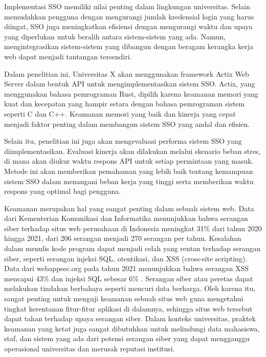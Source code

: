 \documentclass{article}
\begin{document}
Implementasi SSO memiliki nilai penting dalam lingkungan universitas. Selain memudahkan pengguna dengan mengurangi jumlah kredensial login yang harus diingat, SSO juga meningkatkan efisiensi dengan mengurangi waktu dan upaya yang diperlukan untuk beralih antara sistem-sistem yang ada. Namun, mengintegrasikan sistem-sistem yang dibangun dengan beragam kerangka kerja web dapat menjadi tantangan tersendiri.

Dalam penelitian ini, Universitas X akan menggunakan framework Actix Web Server dalam bentuk API untuk mengimplementasikan sistem SSO. Actix, yang menggunakan bahasa pemrograman Rust, dipilih karena keamanan memori yang kuat dan kecepatan yang hampir setara dengan bahasa pemrograman sistem seperti C dan C++. Keamanan memori yang baik dan kinerja yang cepat menjadi faktor penting dalam membangun sistem SSO yang andal dan efisien\autocite{kyriakou2022complementing}.

Selain itu, penelitian ini juga akan mengevaluasi performa sistem SSO yang diimplementasikan. Evaluasi kinerja akan dilakukan melalui skenario beban stres\autocite{ComparativeAnaWaluyo2022}, di mana akan diukur waktu respons API untuk setiap permintaan yang masuk. Metode ini akan memberikan pemahaman yang lebih baik tentang kemampuan sistem SSO dalam menangani beban kerja yang tinggi serta memberikan waktu respons yang optimal bagi pengguna.

Keamanan merupakan hal yang sangat penting dalam sebuah sistem web. Data dari Kementerian Komunikasi dan Informatika menunjukkan bahwa serangan siber terhadap situs web perusahaan di Indonesia meningkat 31\% dari tahun 2020 hingga 2021, dari 206 serangan menjadi 270 serangan per tahun. Kesalahan dalam menulis kode program dapat menjadi celah yang rentan terhadap serangan siber, seperti serangan injeksi SQL, otentikasi, dan XSS (cross-site scripting). Data dari webappsec.org pada tahun 2021 menunjukkan bahwa serangan XSS mencapai 43\% dan injeksi SQL sebesar 6\% . Serangan siber atau peretas dapat melakukan tindakan berbahaya seperti mencuri data berharga. Oleh karena itu, sangat penting untuk menguji keamanan sebuah situs web guna mengetahui tingkat kerentanan fitur-fitur aplikasi di dalamnya, sehingga situs web tersebut dapat tahan terhadap upaya serangan siber. Dalam konteks universitas, praktek keamanan yang ketat juga sangat dibutuhkan untuk melindungi data mahasiswa, staf, dan sistem yang ada dari potensi serangan siber yang dapat mengganggu operasional universitas dan merusak reputasi institusi\autocite{Priyawati2022WebsiteVT}.
\end{document}
